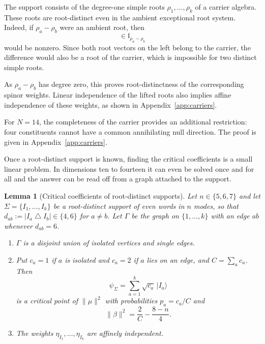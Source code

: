 \documentclass{article}
\newtheorem{lemma}[theorem]{Lemma}
\theoremstyle{definition}
\theoremstyle{remark}
\newcommand{\ket}[1]{\lvert #1\rangle}
\newcommand{\norm}[1]{\lVert #1\rVert}
\newcommand{\symdiff}{\mathbin{\triangle}}
\begin{document}
The support consists of the degree-one simple roots $\rho_1,\ldots,\rho_k$ of a carrier algebra.
These roots are root-distinct even in the ambient exceptional root system. Indeed, if $\rho_a-\rho_b$ were an ambient root, then
\begin{equation}
 [E_{\rho_a},E_{-\rho_b}]
 \in\mathfrak l_{\rho_a-\rho_b}
\end{equation}
would be nonzero. Since both root vectors on
the left belong to the carrier, the difference
would also be a root of the carrier, which is
impossible for two distinct simple roots.

As $\rho_a-\rho_b$ has degree zero, this proves
root-distinctness of the corresponding spinor
weights. Linear independence of the lifted roots
also implies affine independence of these weights,
as shown in Appendix~\ref{app:carriers}.

For $N=14$, the completeness of the carrier
provides an additional restriction: four
constituents cannot have a common annihilating
null direction. The proof is given in
Appendix~\ref{app:carriers}.


Once a root-distinct support is known, finding the critical coefficients is
a small linear problem. In dimensions ten to fourteen it can even be solved
once and for all and the answer can be read off from a graph attached to the
support.

\begin{lemma}[Critical coefficients of root-distinct supports]
\label{lem:dynkin-coefficients}
Let $n\in\{5,6,7\}$ and let $\Sigma=\{I_1,\ldots,I_k\}$ be a root-distinct
support of even words in $n$ modes, so that
$d_{ab}:=\lvert I_a\symdiff I_b\rvert\in\{4,6\}$ for $a\ne b$. Let $\Gamma$
be the graph on $\{1,\ldots,k\}$ with an edge $ab$ whenever $d_{ab}=6$.
\begin{enumerate}
\item $\Gamma$ is a disjoint union of isolated vertices and single edges.
\item Put $c_a=1$ if $a$ is isolated and $c_a=2$ if $a$ lies on an edge, and
      $C=\sum_ac_a$. Then
      \begin{equation}
       \psi_\Sigma=\sum_{a=1}^k\sqrt{c_a}\,\ket{I_a}
       \label{eq:dynkin-critical-state}
      \end{equation}
      is a critical point of $\norm\mu^2$ with probabilities $p_a=c_a/C$ and
      \begin{equation}
       \norm{\beta}^2=\frac2C-\frac{8-n}4 .
       \label{eq:dynkin-norm}
      \end{equation}
\item The weights $\eta_{I_1},\ldots,\eta_{I_k}$ are affinely independent.
\end{enumerate}
\end{lemma}
\end{document}
